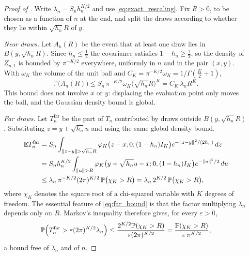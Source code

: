 \documentclass[11pt]{article}
\theoremstyle{definition}
\newcommand{\E}{\mathbb{E}}
\newcommand{\Pp}{\mathbb{P}}
\newcommand{\phik}{\varphi_K}
\begin{document}
\begin{proof}[Proof of ]
Write $\lambda_n=S_nh_n^{K/2}$ and use \eqref{eq:exact_rescaling}. Fix $R>0$, to be chosen as a function of $n$ at the end, and split the draws according to whether they lie within $\sqrt{h_n}R$ of $y$.

\emph{Near draws.} Let $A_n(R)$ be the event that at least one draw lies in $B(y,\sqrt{h_n}R)$. Since $h_n\le\tfrac12$ the covariance satisfies $1-h_n\ge\tfrac12$, so the density of $Z_{n,1}$ is bounded by $\pi^{-K/2}$ everywhere, uniformly in $n$ and in the pair $(x,y)$. With $\omega_K$ the volume of the unit ball and $C_K=\pi^{-K/2}\omega_K=1/\Gamma(\tfrac K2+1)$,
\begin{equation}\label{eq:near_bound}
\Pp\bigl(A_n(R)\bigr)
\le S_n\,\pi^{-K/2}\omega_K\bigl(\sqrt{h_n}R\bigr)^K
=C_K\,\lambda_nR^K .
\end{equation}
This bound does not involve $x$ or $y$: displacing the evaluation point only moves the ball, and the Gaussian density bound is global.

\emph{Far draws.} Let $T_n^{\mathrm{far}}$ be the part of $T_n$ contributed by draws outside $B(y,\sqrt{h_n}R)$. Substituting $z=y+\sqrt{h_n}u$ and using the same global density bound,
\begin{align}
\E T_n^{\mathrm{far}}
&=S_n\int_{\lVert z-y\rVert>\sqrt{h_n}R}\phik\bigl(z-x;0,(1-h_n)I_K\bigr)e^{-\lVert z-y\rVert^2/(2h_n)}\,dz\notag\\
&=S_nh_n^{K/2}\int_{\lVert u\rVert>R}\phik\bigl(y+\sqrt{h_n}u-x;0,(1-h_n)I_K\bigr)e^{-\lVert u\rVert^2/2}\,du\notag\\
&\le\lambda_n\,\pi^{-K/2}(2\pi)^{K/2}\,\Pp\bigl(\chi_K>R\bigr)
=\lambda_n\,2^{K/2}\,\Pp\bigl(\chi_K>R\bigr),\label{eq:far_bound}
\end{align}
where $\chi_K$ denotes the square root of a chi-squared variable with $K$ degrees of freedom. The essential feature of \eqref{eq:far_bound} is that the factor multiplying $\lambda_n$ depends only on $R$. Markov's inequality therefore gives, for every $\varepsilon>0$,
\begin{equation}\label{eq:far_markov}
\Pp\Bigl(T_n^{\mathrm{far}}>\varepsilon(2\pi)^{K/2}\lambda_n\Bigr)
\le\frac{2^{K/2}\Pp(\chi_K>R)}{\varepsilon(2\pi)^{K/2}}
=\frac{\Pp(\chi_K>R)}{\varepsilon\,\pi^{K/2}} ,
\end{equation}
a bound free of $\lambda_n$ and of $n$.


\end{proof}
\end{document}
